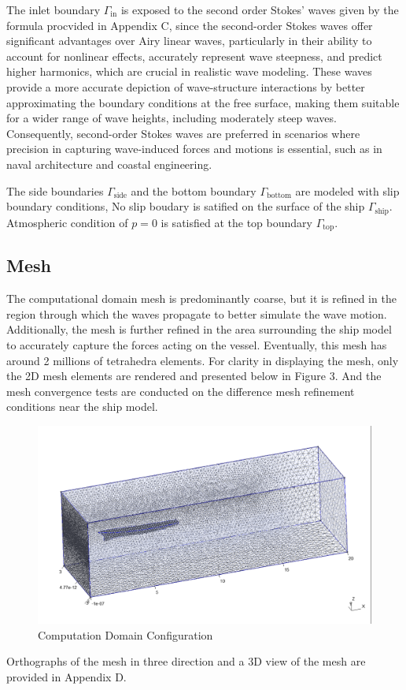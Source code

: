 \documentclass[12pt]{article} %
\begin{document}
The inlet boundary \(\Gamma_{\text{in}}\) is exposed to the second order Stokes' waves given by the formula 
procvided in Appendix C, since the second-order Stokes waves offer significant advantages over Airy linear 
waves, particularly in their ability to account for nonlinear effects, accurately represent wave 
steepness, and predict higher harmonics, which are crucial in realistic wave modeling. These waves 
provide a more accurate depiction of wave-structure interactions by better approximating the boundary 
conditions at the free surface, making them suitable for a wider range of wave heights, including 
moderately steep waves. Consequently, second-order Stokes waves are preferred in scenarios where 
precision in capturing wave-induced forces and motions is essential, such as in naval architecture 
and coastal engineering.


The side boundaries \(\Gamma_{\text{side}}\) and the bottom boundary 
\(\Gamma_{\text{bottom}}\) are modeled with slip boundary conditions, 
No slip boudary is satified on the surface of the ship \(\Gamma_{\text{ship}}\). 
Atmospheric condition of \(p = 0\) is satisfied at the top boundary \(\Gamma_{\text{top}}\).

\subsection{Mesh}
The computational domain mesh is predominantly coarse, but it is refined in the region through which the waves 
propagate to better simulate the wave motion. Additionally, the mesh is further refined in the area surrounding 
the ship model to accurately capture the forces acting on the vessel. Eventually, this mesh has around 2 millions of tetrahedra elements.
For clarity in displaying the mesh, 
only the 2D mesh elements are rendered and presented below in Figure 3. And the mesh convergence tests are
conducted on the difference mesh refinement conditions near the ship model.

\begin{figure}[ht]
    \centering
    \includegraphics[width=1\textwidth]{Mesh_1.png}
    \caption{Computation Domain Configuration}
\end{figure}
Orthographs of the mesh in three direction and a 3D view of the mesh are provided in Appendix D.
\end{document}
